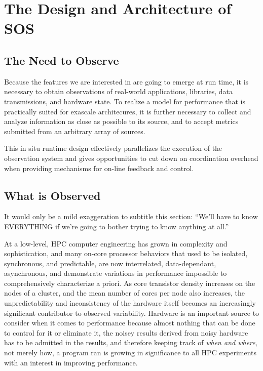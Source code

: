 
\section{The Design and Architecture of SOS}

\subsection{The Need to Observe}
Because the features we are interested in are going to emerge at run
time, it is necessary to obtain observations of real-world
applications, libraries, data transmissions, and hardware state. To
realize a model for performance that is practically suited for
exascale architecures, it is further necessary to collect and analyze
information as close as possible to its source, and to accept metrics
submitted from an arbitrary array of sources.

This in situ runtime design
effectively parallelizes the execution of the observation
system and gives opportunities to cut down on coordination
overhead when providing mechanisms for on-line feedback and control.



\subsection{What is Observed}

It would only be a mild exaggeration to subtitle this section: ``We'll
have to know EVERYTHING if we're going to bother trying to know
anything at all.''

At a low-level, HPC computer engineering has grown in complexity and
sophistication, and many on-core processor behaviors that used to be
isolated, synchronous, and predictable, are now interrelated,
data-dependant, asynchronous, and demonstrate variations in
performance impossible to comprehensively characterize a priori. As
core transistor density increases on the nodes of a cluster, and the
mean number of cores per node also increases, the unpredictability and
inconsistency of the hardware itself becomes an increasingly
significant contributor to observed variability. Hardware is an
important source to consider when it comes to performance because
almost nothing that can be done to control for it or eliminate it, the
noisey results derived from noisy hardware has to be admitted in the
results, and therefore keeping track of \textit{when and where}, not
merely how, a program ran is growing in significance to all HPC experiments
with an interest in improving performance.

